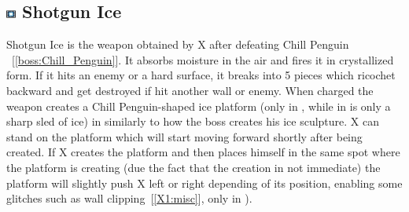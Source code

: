 \subsection{\includegraphics[width=12px, height=10px]{figures/X1/weapons/S_ice.jpg} Shotgun Ice}\label{Shotgun_ice}
Shotgun Ice is the weapon obtained by X after defeating Chill Penguin ~[\ref{boss:Chill_Penguin}]. It absorbs moisture in the air and fires it in crystallized form. If it hits an enemy or a hard surface, it breaks into 5 pieces which ricochet backward and get destroyed if hit another wall or enemy. When charged the weapon creates a Chill Penguin-shaped ice platform (only in \x, while in \mhx is only a sharp sled of ice) in similarly to how the boss creates his ice sculpture. X can stand on the platform which will start moving forward shortly after being created. If X creates the platform and then places himself in the same spot where the platform is creating (due the fact that the creation in not immediate) the platform will slightly push X left or right depending of its position, enabling some glitches such as wall clipping~[\ref{X1:misc}], only in \x).

